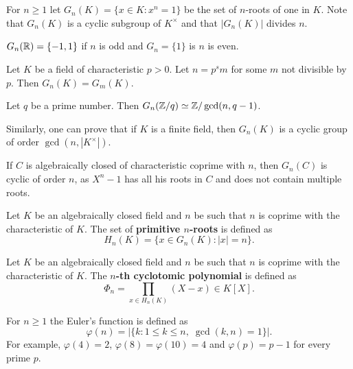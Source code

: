 \chapter{}


For $n\geq1$ let $G_n(K)=\{x\in K:x^n=1\}$ be the 
set of $n$-roots of one in $K$. Note that
$G_n(K)$ is a cyclic subgroup of $K^{\times}$ and that 
$|G_n(K)|$ divides $n$. 

\begin{example}
    $G_n(\mathbb{R})=\{-1,1\}$ if $n$ is odd and $G_{n}=\{1\}$ is $n$ is even.
\end{example}

\begin{exercise}
    Let $K$ be a field of characteristic $p>0$. Let $n=p^sm$ for some $m$ not divisible by $p$. 
    Then $G_n(K)=G_m(K)$. 
\end{exercise}

\begin{exercise}
    Let $q$ be a prime number. Then $G_n(\mathbb{Z}/q)\simeq\mathbb{Z}/\gcd(n,q-1)$. 
\end{exercise}

Similarly, one can prove that if $K$ is a finite field, then $G_n(K)$ is a cyclic group
of order $\gcd(n,|K^{\times}|)$. 

\begin{example}
    If $C$ is algebraically closed of characteristic coprime with $n$, 
    then $G_n(C)$ is cyclic of order $n$, as $X^n-1$ 
    has all his roots in $C$ and does not contain multiple roots. 
\end{example}

Let $K$ be an algebraically closed field and $n$ be
such that $n$ is coprime with the characteristic of $K$. The set of 
\textbf{primitive $n$-roots} is defined as 
\[
H_n(K)=\{x\in G_n(K):|x|=n\}.
\]

\begin{definition}
    Let $K$ be an algebraically closed field and $n$ be
    such that $n$ is coprime with the characteristic of $K$. The \textbf{$n$-th cyclotomic
    polynomial} is defined as 
    \[
    \Phi_n=\prod_{x\in H_n(K)}(X-x)\in K[X].
    \]
\end{definition}

For $n\geq1$ the Euler's function is defined as 
\[
\varphi(n)=|\{k:1\leq k\leq n,\;\gcd(k,n)=1\}|.
\]
For example, $\varphi(4)=2$, $\varphi(8)=\varphi(10)=4$ and $\varphi(p)=p-1$ for every prime $p$. 

